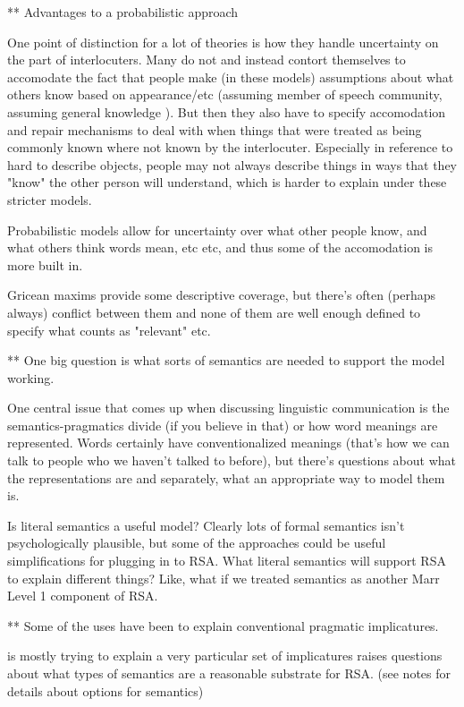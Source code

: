 \documentclass[]{article}
\begin{document}
** Advantages to a probabilistic approach

One point of distinction for a lot of theories is how they handle uncertainty on the part of interlocuters. Many do not and instead contort themselves to accomodate the fact that people make (in these models) assumptions about what others know based on appearance/etc (assuming member of speech community, assuming general knowledge ). But then they also have to specify accomodation and repair mechanisms to deal with when things that were treated as being commonly known where not known by the interlocuter. Especially in reference to hard to describe objects, people may not always describe things in ways that they "know" the other person will understand, which is harder to explain under these stricter models. 

Probabilistic models allow for uncertainty over what other people know, and what others think words mean, etc etc, and thus some of the accomodation is more built in. 

Gricean maxims provide some descriptive coverage, but there's often (perhaps always) conflict between them and none of them are well enough defined to specify what counts as "relevant" etc. 

** One big question is what sorts of semantics are needed to support the model working. 

One central issue that comes up when discussing linguistic communication is the semantics-pragmatics divide (if you believe in that) or how word meanings are represented. Words certainly have conventionalized meanings (that's how we can talk to people who we haven't talked to before), but there's questions about what the representations are and separately, what an appropriate way to model them is. 

Is literal semantics a useful model? Clearly lots of formal semantics isn't psychologically plausible, but some of the approaches could be useful simplifications for plugging in to RSA. What literal semantics will support RSA to explain different things? Like, what if we treated semantics as another Marr Level 1 component of RSA. 


** Some of the uses have been to explain conventional pragmatic implicatures. 

\cite{bergen} is mostly trying to explain a very particular set of implicatures raises questions about what types of semantics are a reasonable substrate for RSA. (see notes for details about options for semantics) 
\end{document}
